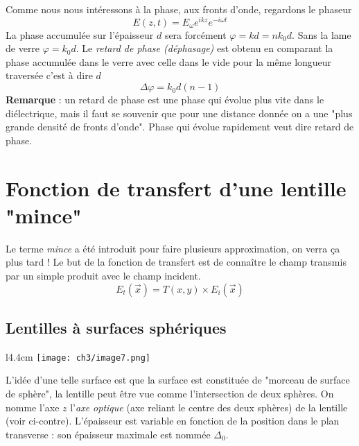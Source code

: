 Comme nous nous intéressons à la phase, aux fronts d'onde, regardons le phaseur
\begin{equation}
E(z,t) = E_\omega e^{ikz}e^{-i\omega t}
\end{equation}
La phase accumulée sur l'épaisseur $d$ sera forcément $\varphi = kd = nk_0d$. Sans la lame de verre 
$\varphi = k_0d$. Le \textit{retard de phase (déphasage)} est obtenu en comparant la phase accumulée 
dans le verre avec celle dans le vide pour la même longueur traversée c'est à dire $d$
\begin{equation}
\Delta\varphi = k_0d(n-1)
\end{equation}
\textbf{Remarque} : un retard de phase est une phase qui évolue plus vite dans le diélectrique, mais 
il faut se souvenir que pour une distance donnée on a une "plus grande densité de fronts d'onde". Phase 
qui évolue rapidement veut dire retard de phase.\\


\newpage
\section{Fonction de transfert d'une lentille "mince"}
Le terme \textit{mince} a été introduit pour faire plusieurs approximation, on verra ça plus tard ! Le 
but de la fonction de transfert est de connaître le champ transmis par un simple produit avec le champ 
incident.
\begin{equation}
E_t(\vec{x}) = T(x,y)\times E_i(\vec{x})
\end{equation}

	\subsection{Lentilles à surfaces sphériques}
	\begin{wrapfigure}[7]{l}{4.4cm}
	\vspace{-5mm}
	\texttt{[image: ch3/image7.png]}
	\end{wrapfigure}
	L'idée d'une telle surface est que la surface est constituée de "morceau de surface de sphère", 
	la lentille peut être vue comme l'intersection de deux sphères. On nomme l'axe $z$ 
	l'\textit{axe optique} (axe reliant le centre des deux sphères) de la lentille (voir ci-contre). 
	L'épaisseur est variable en fonction de la position dans le plan transverse : son épaisseur 
	maximale est nommée $\Delta_0$.\\
	
